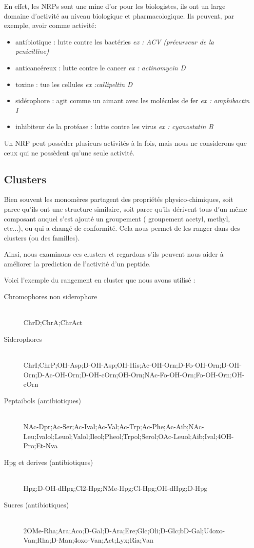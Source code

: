 \documentclass[a4paper,10pt]{report}
\begin{document}
	En effet, les NRPs sont une mine d'or pour les biologistes, ils ont un large domaine d'activité au niveau biologique et pharmacologique. 
	Ils peuvent, par exemple, avoir comme activité:
	\begin{itemize}
	 \item antibiotique : lutte contre les bactéries \textit{ex : ACV (précurseur de la penicilline)}  
	 \item anticancéreux : lutte contre le cancer \textit{ex : actinomycin D}
	 \item toxine :  tue les cellules \textit{ex :callipeltin D}
	 \item sidérophore : agit comme un aimant avec les molécules de fer \textit{ex : amphibactin I}
	 \item inhibiteur de la protéase : lutte contre les virus \textit{ex : cyanostatin B}
	\end{itemize}
	Un NRP peut posséder plusieurs activités à la fois, mais nous ne considerons que ceux qui ne possèdent qu'une seule activité.
       
      \subsection{Clusters}
      
	Bien souvent les monomères partagent des propriétés physico-chimiques, soit parce qu'ils ont une structure similaire, soit parce qu'ils dérivent tous d'un même composant auquel s'est ajouté un groupement ( groupement acetyl, methyl, etc...), ou qui a changé de conformité. Cela nous permet de les ranger dans des clusters (ou des familles).
	
	Ainsi, nous examinons ces clusters et regardons s'ils peuvent nous aider à améliorer la prediction de l'activité d'un peptide.
	
	Voici l'exemple du rangement en cluster que nous avons utilisé :
	
	\begin{description}
	 \item[Chromophores non siderophore] \hfill \\ChrD;ChrA;ChrAct
	 \item[Siderophores] \hfill \\ChrI;ChrP;OH-Asp;D-OH-Asp;OH-His;Ac-OH-Orn;D-Fo-OH-Orn;D-OH-Orn;D-Ac-OH-Orn;D-OH-cOrn;OH-Orn;NAc-Fo-OH-Orn;Fo-OH-Orn;OH-cOrn
	 \item[Peptaibols (antibiotiques)]\hfill \\ NAc-Dpr;Ac-Ser;Ac-Ival;Ac-Val;Ac-Trp;Ac-Phe;Ac-Aib;NAc-Leu;Ivalol;Leuol;Valol;Ileol;Pheol;Trpol;Serol;OAc-Leuol;Aib;Ival;4OH-Pro;Et-Nva
	 \item[Hpg et derives (antibiotiques)] \hfill \\Hpg;D-OH-dHpg;Cl2-Hpg;NMe-Hpg;Cl-Hpg;OH-dHpg;D-Hpg
	 \item[Sucres (antibiotiques)] \hfill \\2OMe-Rha;Ara;Aco;D-Gal;D-Ara;Ere;Glc;Oli;D-Glc;bD-Gal;U4oxo-Van;Rha;D-Man;4oxo-Van;Act;Lyx;Ria;Van
	\end{description}
\end{document}
